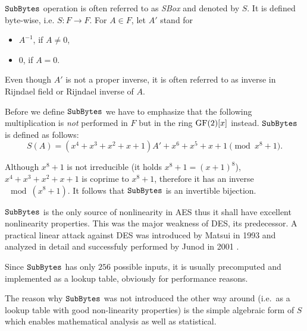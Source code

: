 	$\texttt{SubBytes}$ operation is often referred to as {\em SBox} and denoted by $S$. It is defined byte-wise, i.e. $S: F \rightarrow F$. For $A\in F$, let $A'$ stand for
	\begin{itemize}
		\item $A^{-1}$, if $A \neq 0$,
		\item $0$, if $A = 0$.
	\end{itemize}
	
	\begin{note}
	\label{note:rijinv}
		Even though $A'$ is not a proper inverse, it is often referred to as inverse in Rijndael field or Rijndael inverse of $A$.
	\end{note}
	
	Before we define $\texttt{SubBytes}$ we have to emphasize that the following multiplication is {\em not} performed in $F$ but in the ring $\mathrm{GF}(2)[x]$ instead. $\texttt{SubBytes}$ is defined as follows:
	\newcommand{\defsbox}{S(A) = (x^4 + x^3 + x^2 + x + 1)A' + x^6 + x^5 + x + 1 \pmod{x^8+1}}
	\begin{equation}
	\label{eq:sbox}
		\defsbox .
	\end{equation}
	
	\begin{note}
	\label{note:sboxinv}
		Although $x^8+1$ is not irreducible (it holds $x^8+1 = (x+1)^8$), $x^4 + x^3 + x^2 + x + 1$ is coprime to $x^8+1$, therefore it has an inverse$\mod(x^8+1)$. It follows that $\texttt{SubBytes}$ is an invertible bijection.
	\end{note}
	
	$\texttt{SubBytes}$ is the only source of nonlinearity in AES thus it shall have excellent nonlinearity properties. This was the major weakness of DES, its predecessor. A practical linear attack against DES was introduced by Matsui in 1993 \cite{matsui1994linear} and analyzed in detail and successfuly performed by Junod in 2001 \cite{junod2001complexity}.
	
	\begin{note}
	\label{note:sboxtable}
		Since $\texttt{SubBytes}$ has only $256$ possible inputs, it is usually precomputed and implemented as a lookup table, obviously for performance reasons.
	\end{note}
	
	The reason why $\texttt{SubBytes}$ was not introduced the other way around (i.e.\ as a lookup table with good non-linearity properties) is the simple algebraic form of $S$ which enables mathematical analysis as well as statistical.   %


